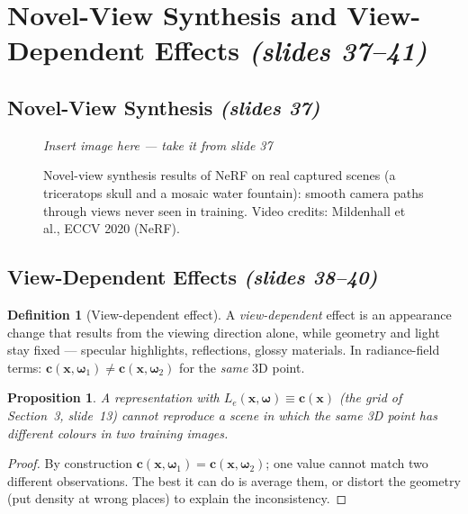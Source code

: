 \documentclass[11pt,a4paper]{article}
\newcommand{\xx}{\boldsymbol{x}}
\newcommand{\om}{\boldsymbol{\omega}}
\newcommand{\cc}{\boldsymbol{c}}
\newcommand{\Le}{L_e}
\newcommand{\sref}[1]{\texorpdfstring{\emph{(slides #1)}}{(slides #1)}}
\theoremstyle{definition}
\newtheorem{definition}{Definition}[section]
\theoremstyle{plain}
\newtheorem{proposition}{Proposition}[section]
\newcommand{\slideimg}[3]{%
\begin{figure}[H]
\centering
\begin{tcolorbox}[enhanced,colback=white,colframe=white,boxrule=0pt,sharp corners,overlay={\draw[dashed,gray,thick] (frame.south west) rectangle (frame.north east);},
  width=0.92\linewidth,height=#2,valign=center,halign=center]
{\color{gray}\itshape Insert image here --- take it from slide #1}
\end{tcolorbox}
\caption{#3}
\end{figure}}
\begin{document}
\section{Novel-View Synthesis and View-Dependent Effects \sref{37--41}}

\subsection{Novel-View Synthesis \sref{37}}

\slideimg{37}{4.6cm}{Novel-view synthesis results of NeRF on real captured scenes (a triceratops skull and a mosaic water fountain): smooth camera paths through views never seen in training. Video credits: Mildenhall et al., ECCV 2020 (NeRF).}

\subsection{View-Dependent Effects \sref{38--40}}

\begin{definition}[View-dependent effect]
A \emph{view-dependent} effect is an appearance change that results from the viewing direction alone, while geometry and light stay fixed --- specular highlights, reflections, glossy materials. In radiance-field terms: $\cc(\xx,\om_1)\neq\cc(\xx,\om_2)$ for the \emph{same} 3D point.
\end{definition}

\begin{proposition}
A representation with $\Le(\xx,\om)\equiv\cc(\xx)$ (the grid of Section~3, slide~13) cannot reproduce a scene in which the same 3D point has different colours in two training images.
\end{proposition}
\begin{proof}
By construction $\cc(\xx,\om_1)=\cc(\xx,\om_2)$; one value cannot match two different observations. The best it can do is average them, or distort the geometry (put density at wrong places) to explain the inconsistency.
\end{proof}
\end{document}
